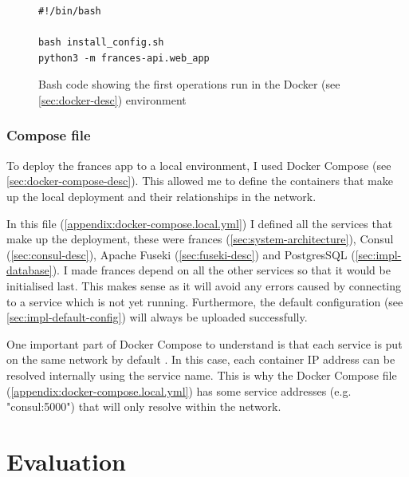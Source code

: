 \documentclass[12pt, letterpaper]{article}
\begin{document}
\begin{flushleft}
\begin{figure}[H]
\label{snippet:new-run-frances}
\begin{verbatim}
#!/bin/bash

bash install_config.sh
python3 -m frances-api.web_app
\end{verbatim}
\caption{Bash code showing the first operations run in the Docker (see \ref{sec:docker-desc}) environment}
\end{figure}
\end{flushleft}

\subsubsection{Compose file}\label{sec:impl-deploy-local}

\begin{flushleft}
To deploy the frances app to a local environment, I used Docker Compose (see \ref{sec:docker-compose-desc}). This allowed me to define the containers that make up the local deployment and their relationships in the network.
\end{flushleft}

\begin{flushleft}
In this file (\ref{appendix:docker-compose.local.yml}) I defined all the services that make up the deployment, these were frances (\ref{sec:system-architecture}), Consul  (\ref{sec:consul-desc}), Apache Fuseki  (\ref{sec:fuseki-desc}) and PostgresSQL (\ref{sec:impl-database}). I made frances depend on all the other services so that it would be initialised last. This makes sense as it will avoid any errors caused by connecting to a service which is not yet running. Furthermore, the default configuration (see \ref{sec:impl-default-config}) will always be uploaded successfully.
\end{flushleft}

\begin{flushleft}
One important part of Docker Compose to understand is that each service is put on the same network by default \cite{docker-compose-example}. In this case, each container IP address can be resolved internally using the service name. This is why the Docker Compose file (\ref{appendix:docker-compose.local.yml}) has some service addresses (e.g. "consul:5000") that will only resolve within the network. 
\end{flushleft}

\section{Evaluation}\label{sec:evaluation}
\end{document}
